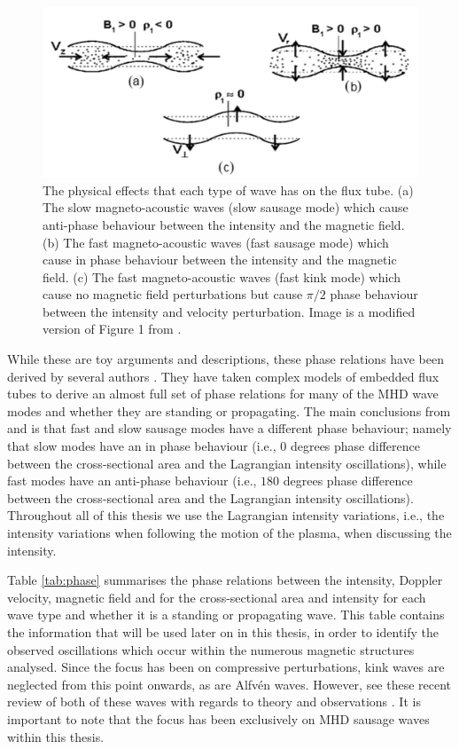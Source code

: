     \begin{figure}
    	\centering
    	\includegraphics[width=\textwidth]{tube}
    	\caption{
    		The physical effects that each type of wave has on the flux tube.
    		(a) The slow magneto-acoustic waves (slow sausage mode) which cause anti-phase behaviour between the intensity and the magnetic field.
    		(b) The fast magneto-acoustic waves (fast sausage mode) which cause in phase behaviour between the intensity and the magnetic field.
    		(c) The fast magneto-acoustic waves (fast kink mode) which cause no magnetic field perturbations but cause $\pi/2$ phase behaviour between the intensity and velocity perturbation.
    		Image is a modified version of Figure 1 from \cite{CLOO}.
    	}
    	\label{fig:tube}
    \end{figure}
   
	While these are toy arguments and descriptions, these phase relations have been derived by several authors \citep{PMHDW,Moreels2013,Moreels2013b,2015A&A...579A..73M}.
    They have taken complex models of embedded flux tubes to derive an almost full set of phase relations for many of the MHD wave modes and whether they are standing or propagating.
	The main conclusions from \cite{Moreels2013} and \cite{Moreels2013b} is that fast and slow sausage modes have a different phase behaviour; namely that slow modes have an in phase behaviour (i.e., $0$ degrees phase difference between the cross-sectional area and the Lagrangian intensity oscillations), while fast modes have an anti-phase behaviour (i.e., $180$ degrees phase difference between the cross-sectional area and the Lagrangian intensity oscillations).
    Throughout all of this thesis we use the Lagrangian intensity variations, i.e., the intensity variations when following the motion of the plasma, when discussing the intensity. 
     
    Table \ref{tab:phase} summarises the phase relations between the intensity, Doppler velocity, magnetic field and for the cross-sectional area and intensity for each wave type and whether it is a standing or propagating wave.
    This table contains the information that will be used later on in this thesis, in order to identify the observed oscillations which occur within the numerous magnetic structures analysed. 
    Since the focus has been on compressive perturbations, kink waves are neglected from this point onwards, as are Alfv\'en waves.
    However, see these recent review of both of these waves with regards to theory and observations \citep{Mathioudakis2013,jess2015multiwavelength}.
    It is important to note that the focus has been exclusively on MHD sausage waves within this thesis.
  
